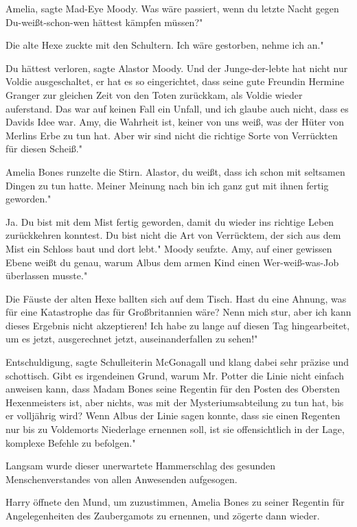 \glqq{}Amelia\grqq{}, sagte Mad-Eye Moody. \glqq{}Was wäre passiert, wenn du
letzte Nacht gegen Du-weißt-schon-wen hättest kämpfen müssen?"

Die alte Hexe zuckte mit den Schultern. \glqq{}Ich wäre gestorben, nehme ich an."

\glqq{}Du hättest verloren\grqq{}, sagte Alastor Moody. \glqq{}Und der
Junge-der-lebte hat nicht nur Voldie ausgeschaltet, er hat es so eingerichtet,
dass seine gute Freundin Hermine Granger zur gleichen Zeit von den Toten
zurückkam, als Voldie wieder auferstand. Das war auf keinen Fall ein Unfall, und
ich glaube auch nicht, dass es Davids Idee war. Amy, die Wahrheit ist, keiner
von uns weiß, was der Hüter von Merlins Erbe zu tun hat. Aber wir sind nicht die
richtige Sorte von Verrückten für diesen Scheiß."

Amelia Bones runzelte die Stirn. \glqq{}Alastor, du weißt, dass ich schon mit
seltsamen Dingen zu tun hatte. Meiner Meinung nach bin ich ganz gut mit ihnen
fertig geworden."

\glqq{}Ja. Du bist mit dem Mist fertig geworden, damit du wieder ins richtige
Leben zurückkehren konntest. Du bist nicht die Art von Verrücktem, der sich aus
dem Mist ein Schloss baut und dort lebt." Moody seufzte. \glqq{}Amy, auf einer
gewissen Ebene weißt du genau, warum Albus dem armen Kind einen Wer-weiß-was-Job
überlassen musste."

Die Fäuste der alten Hexe ballten sich auf dem Tisch. \glqq{}Hast du eine Ahnung,
was für eine Katastrophe das für Großbritannien wäre? Nenn mich stur, aber ich
kann dieses Ergebnis nicht akzeptieren! Ich habe zu lange auf diesen Tag
hingearbeitet, um es jetzt, ausgerechnet jetzt, auseinanderfallen zu sehen!"

\glqq{}Entschuldigung\grqq{}, sagte Schulleiterin McGonagall und klang dabei sehr
präzise und schottisch. \glqq{}Gibt es irgendeinen Grund, warum Mr. Potter die
Linie nicht einfach anweisen kann, dass Madam Bones seine Regentin für den
Posten des Obersten Hexenmeisters ist, aber nichts, was mit der
Mysteriumsabteilung zu tun hat, bis er volljährig wird? Wenn Albus der Linie
sagen konnte, dass sie einen Regenten nur bis zu Voldemorts Niederlage ernennen
soll, ist sie offensichtlich in der Lage, komplexe Befehle zu befolgen."

Langsam wurde dieser unerwartete Hammerschlag des gesunden Menschenverstandes
von allen Anwesenden aufgesogen.

Harry öffnete den Mund, um zuzustimmen, Amelia Bones zu seiner Regentin für
Angelegenheiten des Zaubergamots zu ernennen, und zögerte dann wieder.

